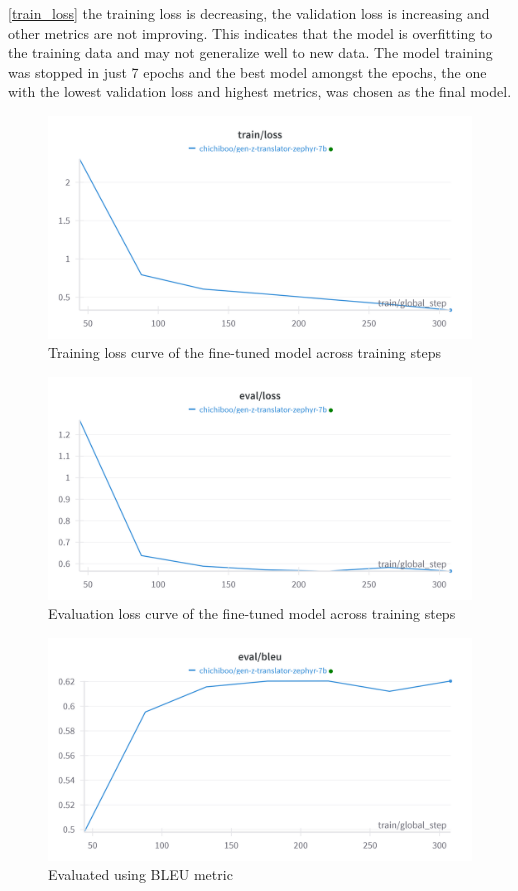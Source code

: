 \ref{train_loss} the training loss is decreasing, the validation loss is increasing and other metrics are not improving. This indicates that the model is overfitting to the training data and may not generalize well to new data. The model training was stopped in just 7 epochs and the best model amongst the epochs, the one with the lowest validation loss and highest metrics, was chosen as the final model.
\begin{figure}[H]
	\centering
	\includegraphics[scale=0.2]{figures/TrainLoss.png}
	\caption{Training loss curve of the fine-tuned model across training steps}
\end{figure}
\begin{figure}[H]
	\centering
	\includegraphics[scale=0.2]{figures/EvaluationLoss.png}
	\caption{Evaluation loss curve of the fine-tuned model across training steps}
\end{figure}
\begin{figure}[H]
	\centering
	\includegraphics[scale=0.2]{figures/BLEUEvaluation.png}
	\caption{Evaluated using BLEU metric}
\end{figure}
